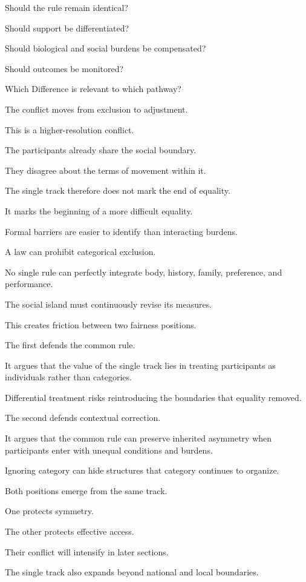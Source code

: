 Should the rule remain identical?

Should support be differentiated?

Should biological and social burdens be compensated?

Should outcomes be monitored?

Which Difference is relevant to which pathway?

The conflict moves from exclusion to adjustment.

This is a higher-resolution conflict.

The participants already share the social boundary.

They disagree about the terms of movement within it.

The single track therefore does not mark the end of equality.

It marks the beginning of a more difficult equality.

Formal barriers are easier to identify than interacting burdens.

A law can prohibit categorical exclusion.

No single rule can perfectly integrate body, history, family, preference, and performance.

The social island must continuously revise its measures.

This creates friction between two fairness positions.

The first defends the common rule.

It argues that the value of the single track lies in treating participants as individuals rather than categories.

Differential treatment risks reintroducing the boundaries that equality removed.

The second defends contextual correction.

It argues that the common rule can preserve inherited asymmetry when participants enter with unequal conditions and burdens.

Ignoring category can hide structures that category continues to organize.

Both positions emerge from the same track.

One protects symmetry.

The other protects effective access.

Their conflict will intensify in later sections.

The single track also expands beyond national and local boundaries.

